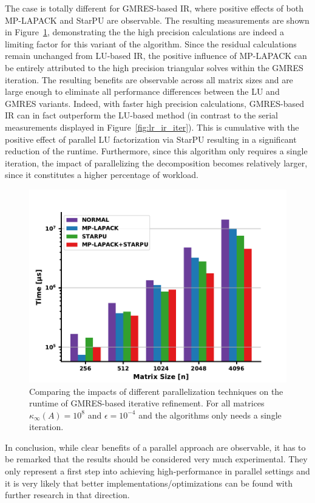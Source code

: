 The case is totally different for GMRES-based IR, where positive effects of both MP-LAPACK and StarPU are observable. The resulting measurements are shown in Figure~\hyperref[fig:gmres_parallel]{\ref{fig:gmres_parallel}}, demonstrating the the high precision calculations are indeed a limiting factor for this variant of the algorithm. Since the residual calculations remain unchanged from LU-based IR, the positive influence of MP-LAPACK can be entirely attributed to the high precision triangular solves within the GMRES iteration. The resulting benefits are observable across all matrix sizes and are large enough to eliminate all performance differences between the LU and GMRES variants. Indeed, with faster high precision calculations, GMRES-based IR can in fact outperform the LU-based method (in contrast to the serial measurements displayed in Figure~\hyperref[fig:lr_ir_iter]{\ref{fig:lr_ir_iter}}). 
This is cumulative with the positive effect of parallel LU factorization via StarPU resulting in a significant reduction of the runtime. Furthermore, since this algorithm only requires a single iteration, the impact of parallelizing the decomposition becomes relatively larger, since it constitutes a higher percentage of workload.

\begin{figure}[h]
    \centering
    \includegraphics[width=0.8\linewidth]{chapters/5_experiments/figures/GMRES_parallel.pdf}
    \caption[Parallel GMRES-based IR]{Comparing the impacts of different parallelization techniques on the runtime of GMRES-based iterative refinement. For all matrices $\kappa_\infty(A)=10^8$ and $\epsilon=10^{-4}$ and the algorithms only needs a single iteration.}
    \label{fig:gmres_parallel}
\end{figure}

In conclusion, while clear benefits of a parallel approach are observable, it has to be remarked that the results should be considered very much experimental. They only represent a first step into achieving high-performance in parallel settings and it is very likely that better implementations/optimizations can be found with further research in that direction. 